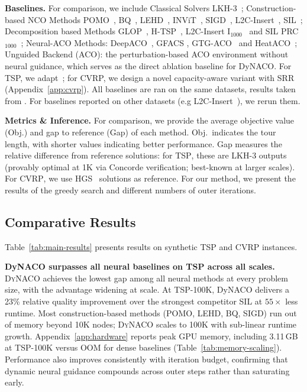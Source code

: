 \documentclass[sigconf]{acmart}
\newcommand{\TSP}{\textsc{TSP}}
\newcommand{\CVRP}{\textsc{CVRP}}
\newcommand{\DyNACO}{\textsc{DyNACO}}
\begin{document}
\smallskip\noindent\textbf{Baselines.}
For comparison, we include Classical Solvers LKH-3~\cite{lkhtsp, lkhcvrp}; Construction-based NCO Methods POMO~\cite{pomo}, BQ~\cite{bq}, LEHD~\cite{lehd}, INViT~\cite{invit}, SIGD~\cite{sigd}, L2C-Insert~\cite{l2c}, SIL~\cite{sil}; Decomposition based Methods GLOP~\cite{glop}, H-TSP~\cite{htsp}, L2C-Insert I$_{1000}$~\cite{l2c} and SIL PRC$_{1000}$~\cite{sil}; Neural-ACO Methods: DeepACO~\cite{deepaco}, GFACS \cite{gfacs}, GTG-ACO~\cite{gtgaco} and HeatACO~\cite{heataco}; Unguided Backend (ACO): the perturbation-based ACO environment without neural guidance, which serves as the direct ablation baseline for DyNACO. For TSP, we adapt~\cite{faco}; for CVRP, we design a novel capacity-aware variant with SRR (Appendix~\ref{app:cvrp}).
All baselines are ran on the same datasets, results taken from \cite{l2c, sil}. For baselines reported on other datasets (e.g L2C-Insert~\cite{l2c}), we rerun them.

\smallskip\noindent\textbf{Metrics \& Inference.}
For comparison, we provide the average objective value (Obj.) and gap to reference (Gap) of each method. Obj.\ indicates the tour length, with shorter values indicating better performance. Gap measures the relative difference from reference solutions: for \TSP{}, these are LKH-3 outputs (provably optimal at 1K via Concorde verification; best-known at larger scales). For \CVRP{}, we use HGS~\cite{hgs} solutions as reference.
For our method, we present the results of the greedy search and different numbers of outer iterations.

\subsection{Comparative Results}
\label{sec:main-results}

Table~\ref{tab:main-results} presents results on synthetic \TSP{} and \CVRP{} instances.

\smallskip\noindent\textbf{DyNACO surpasses all neural baselines on TSP across all scales.}
\DyNACO{} achieves the lowest gap among all neural methods at every problem size, with the advantage widening at scale.
At TSP-100K, DyNACO delivers a 23\% relative quality improvement over the strongest competitor SIL at $55{\times}$ less runtime.
Most construction-based methods (POMO, LEHD, BQ, SIGD) run out of memory beyond 10K nodes; \DyNACO{} scales to 100K with sub-linear runtime growth.
Appendix~\ref{app:hardware} reports peak GPU memory, including 3.11\,GB at TSP-100K versus OOM for dense baselines (Table~\ref{tab:memory-scaling}).
Performance also improves consistently with iteration budget, confirming that dynamic neural guidance compounds across outer steps rather than saturating early.
\end{document}
